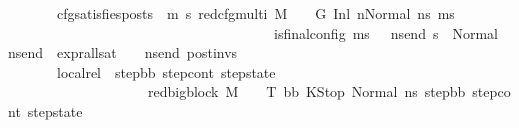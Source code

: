 \begin{isabellebody}
\ \ \ \ \ \ \ cfg{\isacharunderscore}{\kern0pt}satisfies{\isacharunderscore}{\kern0pt}posts{\isacharcolon}{\kern0pt}\ {\isachardoublequoteopen}{\isasymAnd}\ m{\isacharprime}{\kern0pt}\ s{\isacharprime}{\kern0pt}{\isachardot}{\kern0pt}\ {\isacharparenleft}{\kern0pt}red{\isacharunderscore}{\kern0pt}cfg{\isacharunderscore}{\kern0pt}multi\ M\ {\isasymLambda}\ {\isasymGamma}\ {\isasymOmega}\ G\ {\isacharparenleft}{\kern0pt}{\isacharparenleft}{\kern0pt}Inl\ n{\isacharparenright}{\kern0pt}{\isacharcomma}{\kern0pt}{\isacharparenleft}{\kern0pt}Normal\ ns{}{\isacharparenright}{\kern0pt}{\isacharparenright}{\kern0pt}\ {\isacharparenleft}{\kern0pt}m{\isacharprime}{\kern0pt}{\isacharcomma}{\kern0pt}s{\isacharprime}{\kern0pt}{\isacharparenright}{\kern0pt}{\isacharparenright}{\kern0pt}\ {\isasymLongrightarrow}\ \isanewline
\ \ \ \ \ \ \ \ \ \ \ \ \ \ \ \ \ \ \ \ \ \ \ \ \ \ \ \ \ \ \ \ \ \ \ \ \ \ is{\isacharunderscore}{\kern0pt}final{\isacharunderscore}{\kern0pt}config\ {\isacharparenleft}{\kern0pt}m{\isacharprime}{\kern0pt}{\isacharcomma}{\kern0pt}s{\isacharprime}{\kern0pt}{\isacharparenright}{\kern0pt}\ {\isasymLongrightarrow}\ {\isacharparenleft}{\kern0pt}{\isasymforall}\ ns{\isacharunderscore}{\kern0pt}end{\isachardot}{\kern0pt}\ s{\isacharprime}{\kern0pt}\ {\isacharequal}{\kern0pt}\ Normal\ ns{\isacharunderscore}{\kern0pt}end\ {\isasymlongrightarrow}\ {\isacharparenleft}{\kern0pt}expr{\isacharunderscore}{\kern0pt}all{\isacharunderscore}{\kern0pt}sat\ {\isasymLambda}\ {\isasymGamma}\ {\isasymOmega}\ ns{\isacharunderscore}{\kern0pt}end{\isacharparenright}{\kern0pt}\ post{\isacharunderscore}{\kern0pt}invs{\isacharparenright}{\kern0pt}{\isachardoublequoteclose}\isanewline
\ \ \ \ \ \ \ local{\isacharunderscore}{\kern0pt}rel{\isacharcolon}{\kern0pt}\ {\isachardoublequoteopen}{\isasymAnd}\ step{\isacharunderscore}{\kern0pt}bb\ step{\isacharunderscore}{\kern0pt}cont\ step{\isacharunderscore}{\kern0pt}state{\isachardot}{\kern0pt}\ \isanewline
\ \ \ \ \ \ \ \ \ \ \ \ \ \ \ \ \ \ \ \ red{\isacharunderscore}{\kern0pt}bigblock\ M\ {\isasymLambda}\ {\isasymGamma}\ {\isasymOmega}\ T\ {\isacharparenleft}{\kern0pt}bb{\isacharcomma}{\kern0pt}\ KStop{\isacharcomma}{\kern0pt}\ {\isacharparenleft}{\kern0pt}Normal\ ns{}{\isacharparenright}{\kern0pt}{\isacharparenright}{\kern0pt}\ {\isacharparenleft}{\kern0pt}step{\isacharunderscore}{\kern0pt}bb{\isacharcomma}{\kern0pt}\ step{\isacharunderscore}{\kern0pt}cont{\isacharcomma}{\kern0pt}\ step{\isacharunderscore}{\kern0pt}state{\isacharparenright}{\kern0pt}\ {\isasymLongrightarrow}\ \isanewline

\end{isabellebody}
